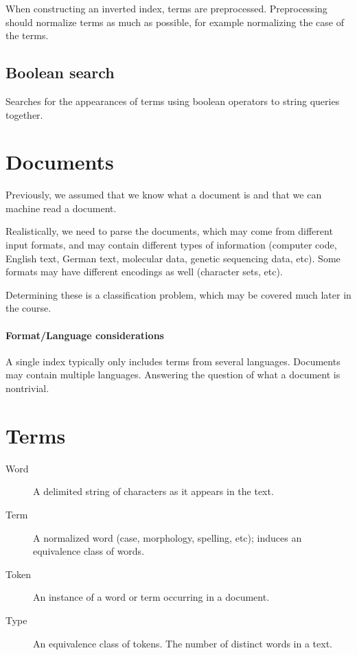 \documentclass{idc_msc}
\begin{document}
When constructing an inverted index, terms are preprocessed.
Preprocessing should normalize terms as much as possible, for example normalizing the case of the terms.

\subsection{Boolean search}

Searches for the appearances of terms using boolean operators to string queries together.

\section{Documents}

Previously, we assumed that we know what a document is and that we can machine read a document.

Realistically, we need to parse the documents, which may come from different input formats, and may contain different types of information (computer code, English text, German text, molecular data, genetic sequencing data, etc). Some formats may have different encodings as well (character sets, etc).

Determining these is a classification problem, which may be covered much later in the course\cite[Chapter 13]{manning2008introduction}.

\paragraph{Format/Language considerations}

A single index typically only includes terms from several languages.
Documents may contain multiple languages.
Answering the question of what a document is nontrivial.

\section{Terms}

\begin{description}
  \item[Word] A delimited string of characters as it appears in the text.
  \item[Term] A normalized word (case, morphology, spelling, etc); induces an equivalence class of words.
  \item[Token] An instance of a word or term occurring in a document.
  \item[Type] An equivalence class of tokens. The number of distinct words in a text.
\end{description}
\end{document}
